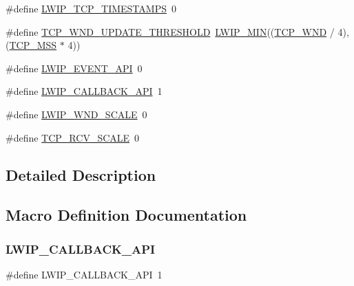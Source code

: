 \begin{DoxyCompactItemize}
\item 
\#define \hyperlink{group__lwip__opts__tcp_ga249bc450bb818cf2ef3cf1472ff354fd}{L\+W\+I\+P\+\_\+\+T\+C\+P\+\_\+\+T\+I\+M\+E\+S\+T\+A\+M\+PS}~0
\item 
\#define \hyperlink{group__lwip__opts__tcp_ga5d45732ba3a8438b141096d86e07ef8d}{T\+C\+P\+\_\+\+W\+N\+D\+\_\+\+U\+P\+D\+A\+T\+E\+\_\+\+T\+H\+R\+E\+S\+H\+O\+LD}~\hyperlink{openmote-cc2538_2lwip_2src_2include_2lwip_2def_8h_a748f5df614a3fc989e8900fd229d6e4e}{L\+W\+I\+P\+\_\+\+M\+IN}((\hyperlink{openmote-cc2538_2lwip_2test_2unit_2lwipopts_8h_a7f535a6efb5cdf86c3210e35ece1d6a7}{T\+C\+P\+\_\+\+W\+ND} / 4), (\hyperlink{group__lwip__opts__tcp_gaf1ab7bb27860aa3677c387a2f3ba317b}{T\+C\+P\+\_\+\+M\+SS} $\ast$ 4))
\item 
\#define \hyperlink{group__lwip__opts__tcp_ga39f76e811117155be8525bb386ecddb7}{L\+W\+I\+P\+\_\+\+E\+V\+E\+N\+T\+\_\+\+A\+PI}~0
\item 
\#define \hyperlink{group__lwip__opts__tcp_ga2ca03bfa6f604ba536e38ccfdbdf9c8d}{L\+W\+I\+P\+\_\+\+C\+A\+L\+L\+B\+A\+C\+K\+\_\+\+A\+PI}~1
\item 
\#define \hyperlink{group__lwip__opts__tcp_ga88dbbfeeeb41b129fdc8235fc08bb530}{L\+W\+I\+P\+\_\+\+W\+N\+D\+\_\+\+S\+C\+A\+LE}~0
\item 
\#define \hyperlink{group__lwip__opts__tcp_ga768765a2c678fefeca6c89aae0cf629f}{T\+C\+P\+\_\+\+R\+C\+V\+\_\+\+S\+C\+A\+LE}~0
\end{DoxyCompactItemize}


\subsection{Detailed Description}


\subsection{Macro Definition Documentation}
\mbox{\label{group__lwip__opts__tcp_ga2ca03bfa6f604ba536e38ccfdbdf9c8d}} 
\subsubsection{\texorpdfstring{L\+W\+I\+P\+\_\+\+C\+A\+L\+L\+B\+A\+C\+K\+\_\+\+A\+PI}{LWIP\_CALLBACK\_API}\hspace{0.1cm}{\footnotesize\ttfamily [1/2]}}
{\footnotesize\ttfamily \#define L\+W\+I\+P\+\_\+\+C\+A\+L\+L\+B\+A\+C\+K\+\_\+\+A\+PI~1}

